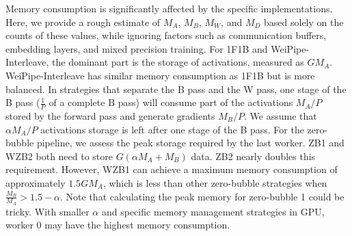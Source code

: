 \documentclass[sigplan,screen]{acmart}
\begin{document}



Memory consumption is significantly affected by the specific implementations. Here, we provide a rough estimate of $M_A$, $M_B$, $M_W$, and $M_D$ based solely on the counts of these values, while ignoring factors such as communication buffers, embedding layers, and mixed precision training. For 1F1B and WeiPipe-Interleave, the dominant part is the storage of activations, measured as $GM_A$. WeiPipe-Interleave has similar memory consumption as 1F1B but is more balanced. In strategies that separate the B pass and the W pass, one stage of the B pass ($\frac{1}{P}$ of a complete B pass) will consume part of the activations $M_A/P$ stored by the forward pass and generate gradients $M_B/P$. We assume that $\alpha M_A/P$ activations storage is left after one stage of the B pass. For the zero-bubble pipeline, we assess the peak storage required by the last worker. ZB1 and WZB2 both need to store $G(\alpha M_A+M_B)$ data. ZB2 nearly doubles this requirement. However, WZB1 can achieve a maximum memory consumption of approximately $1.5GM_A$, which is less than other zero-bubble strategies when $\frac{M_B}{M_A} > 1.5-\alpha $. Note that calculating the peak memory for zero-bubble 1 could be tricky. With smaller $\alpha$ and specific memory management strategies in GPU, worker 0 may have the highest memory consumption. 




\end{document}
